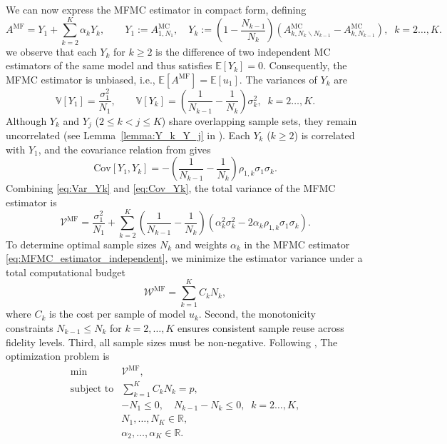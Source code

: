  We can now express the MFMC estimator in compact form, defining
\begin{equation*}
A^{\text{MF}} = Y_1 + \sum_{k=2}^K \alpha_k Y_k, \qquad 
Y_1 := A^{\text{MC}}_{1,N_1},\quad 
Y_k := \left(1-\frac{N_{k-1}}{N_k}\right)\!\left(A^{\text{MC}}_{k,N_k\backslash N_{k-1}} - A^{\text{MC}}_{k,N_{k-1}}\right), \;\; k=2\ldots, K.
\end{equation*}
%
we observe that each $Y_k$ for $k\ge2$ is the difference of two independent MC estimators of the same model and thus satisfies $\mathbb{E}[Y_k]=0$. Consequently, the MFMC estimator is unbiased, i.e., $\mathbb{E}[A^{\text{MF}}]=\mathbb{E}[u_{1}]$. The variances of $Y_k$ are
%
\begin{equation}\label{eq:Var_Yk}
    \mathbb{V}[Y_1] = \frac{\sigma_1^2}{N_1}, \qquad 
    \mathbb{V}[Y_k] = \left(\frac{1}{N_{k-1}} - \frac{1}{N_k}\right)\sigma_k^2, \;\; k=2\ldots, K.
\end{equation}
%
Although $Y_k$ and $Y_j$ ($2\le k<j\le K$) share overlapping sample sets, they remain uncorrelated (see Lemma~\ref{lemma:Y_k_Y_j} in \cite{LiMh:2025}). Each $Y_k$ ($k\ge2$) is correlated with $Y_1$, and the covariance relation from \cite[Lemma~3.2]{PeWiGu:2016} gives
%
\begin{equation}\label{eq:Cov_Yk}
\text{Cov}[Y_1,Y_k] = - \left(\frac{1}{N_{k-1}} - \frac{1}{N_k}\right)\rho_{1,k}\sigma_1\sigma_k.
\end{equation}
%
Combining \eqref{eq:Var_Yk} and \eqref{eq:Cov_Yk}, the total variance of the MFMC estimator is
%
\begin{equation}\label{eq:MFMC_variance}
    \mathcal{V}^{\text{MF}}
    =\frac{\sigma_1^2}{N_1} 
    + \sum_{k=2}^K \left(\frac{1}{N_{k-1}} - \frac{1}{N_k}\right)\!\left(\alpha_k^2\sigma_k^2 - 2\alpha_k\rho_{1,k}\sigma_1\sigma_k\right).
\end{equation}
%
To determine optimal sample sizes $N_k$ and weights $\alpha_k$ in the MFMC estimator \eqref{eq:MFMC_estimator_independent}, we minimize the estimator variance under a total computational budget
\[
\mathcal{W}^{\text{MF}} = \sum_{k=1}^K C_k N_k,
\]
where $C_k$ is the cost per sample of model $u_k$. Second,  the monotonicity constraints $N_{k-1}\le N_k$ for $k=2,\ldots, K$ ensures consistent sample reuse across fidelity levels. Third, all sample sizes must be non-negative. Following \cite{PeWiGu:2016}, The optimization problem is
%
\begin{equation}\label{eq:Optimization_pb_sample_size}
    \begin{array}{ll}
    \min &\mathcal{V}^{\text{MF}},\\
       \text{subject to} &\displaystyle\sum\limits_{k=1}^K C_kN_k=p,\\[2pt]
       &\displaystyle -N_1\le 0,\quad \displaystyle N_{k-1}-N_k\le 0, \;\; k=2\ldots,K,\\
       &N_1,\ldots, N_K\in \mathbb{R},\\
       &\alpha_2,\ldots,\alpha_K\in \mathbb{R}.
    \end{array}
\end{equation}
